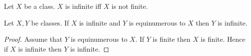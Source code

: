 \documentclass[10pt]{article}
\begin{document}
  \begin{forthel}
    \begin{definition}
      Let $X$ be a class.
      $X$ is infinite iff $X$ is not finite.
    \end{definition}
  \end{forthel}

  \begin{forthel}
    \begin{proposition}
      Let $X, Y$ be classes.
      If $X$ is infinite and $Y$ is equinumerous to $X$ then $Y$ is infinite.
    \end{proposition}
    \begin{proof}
      Assume that $Y$ is equinumerous to $X$.
      If $Y$ is finite then $X$ is finite.
      Hence if $X$ is infinite then $Y$ is infinite.
    \end{proof}
  \end{forthel}
\end{document}
